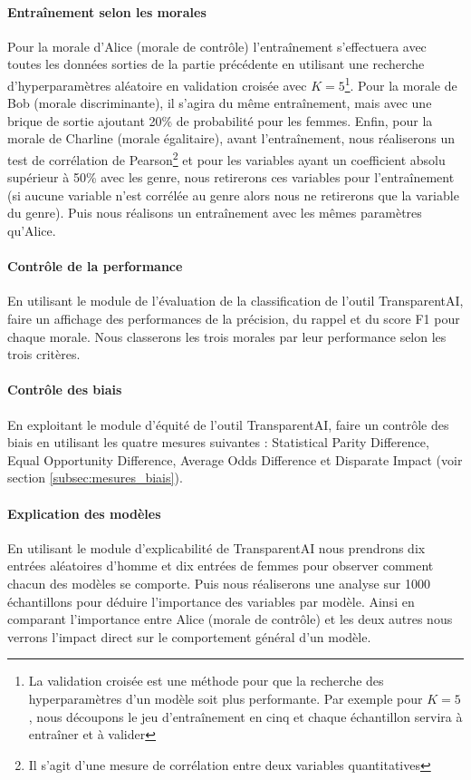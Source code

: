 \documentclass[10pt, french, a4paper]{report}
\begin{document}
\paragraph{Entraînement selon les morales} Pour la morale d'Alice (morale de contrôle) l'entraînement s'effectuera avec toutes les données sorties de la partie précédente en utilisant une recherche d'hyperparamètres aléatoire en validation croisée avec $K=5$\footnote{La validation croisée est une méthode pour que la recherche des hyperparamètres d'un modèle soit plus performante. Par exemple pour $K=5$, nous découpons le jeu d'entraînement en cinq et chaque échantillon servira à entraîner et à valider}. Pour la morale de Bob (morale discriminante), il s'agira du même entraînement, mais avec une brique de sortie ajoutant 20\% de probabilité pour les femmes. Enfin, pour la morale de Charline (morale égalitaire), avant l'entraînement, nous réaliserons un test de corrélation de Pearson\footnote{Il s'agit d'une mesure de corrélation entre deux variables quantitatives} et pour les variables ayant un coefficient absolu supérieur à 50\% avec les genre, nous retirerons ces variables pour l'entraînement (si aucune variable n'est corrélée au genre alors nous ne retirerons que la variable du genre). Puis nous réalisons un entraînement avec les mêmes paramètres qu'Alice.

\paragraph{Contrôle de la performance} En utilisant le module de l'évaluation de la classification de l'outil TransparentAI, faire un affichage des performances de la précision, du rappel et du score F1 pour chaque morale. Nous classerons les trois morales par leur performance selon les trois critères.

\paragraph{Contrôle des biais} En exploitant le module d'équité de l'outil TransparentAI, faire un contrôle des biais en utilisant les quatre mesures suivantes : Statistical Parity Difference, Equal Opportunity Difference, Average Odds Difference et Disparate Impact (voir section \ref{subsec:mesures_biais}).

\paragraph{Explication des modèles} En utilisant le module d'explicabilité de TransparentAI nous prendrons dix entrées aléatoires d'homme et dix entrées de femmes pour observer comment chacun des modèles se comporte. Puis nous réaliserons une analyse sur 1000 échantillons pour déduire l'importance des variables par modèle. Ainsi en comparant l'importance entre Alice (morale de contrôle) et les deux autres nous verrons l'impact direct sur le comportement général d'un modèle.
\end{document}
